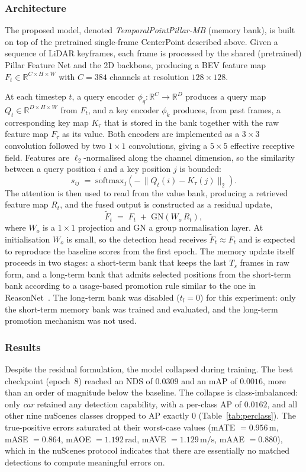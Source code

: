 \documentclass[12pt,a4paper]{report}
\begin{document}
\subsubsection{Architecture}
\quad The proposed model, denoted \emph{TemporalPointPillar-MB}
(memory bank), is built on top of the pretrained single-frame
CenterPoint described above. Given a sequence of LiDAR keyframes,
each frame is processed by the shared (pretrained) Pillar Feature
Net and the 2D backbone, producing a BEV feature map
$F_t \in \mathbb{R}^{C \times H \times W}$ with $C = 384$ channels
at resolution $128 \times 128$.

\quad At each timestep $t$, a query encoder
$\phi_q : \mathbb{R}^{C} \to \mathbb{R}^{D}$ produces a query map
$Q_t \in \mathbb{R}^{D \times H \times W}$ from $F_t$, and a key
encoder $\phi_k$ produces, from past frames, a corresponding key
map $K_\tau$ that is stored in the bank together with the raw
feature map $F_\tau$ as its value. Both encoders are implemented
as a $3 \times 3$ convolution followed by two $1 \times 1$
convolutions, giving a $5 \times 5$ effective receptive field.
Features are $\ell_2$-normalised along the channel dimension, so
the similarity between a query position $i$ and a key position $j$
is bounded:
\[
s_{ij} \;=\; \mathrm{softmax}_j\!\left(
  -\,\lVert Q_t(i) - K_\tau(j) \rVert_2
\right).
\]
The attention is then used to read from the value bank, producing
a retrieved feature map $R_t$, and the fused output is constructed
as a residual update,
\[
\tilde{F}_t \;=\; F_t \;+\; \mathrm{GN}(W_{\!o}\, R_t),
\]
where $W_{\!o}$ is a $1 \times 1$ projection and $\mathrm{GN}$ a
group normalisation layer. At initialisation $W_{\!o}$ is small,
so the detection head receives $\tilde{F}_t \approx F_t$ and is
expected to reproduce the baseline scores from the first epoch.
The memory update itself proceeds in two stages: a short-term bank
that keeps the last $T_s$ frames in raw form, and a long-term bank
that admits selected positions from the short-term bank according
to a usage-based promotion rule similar to the one in
ReasonNet~\cite{Shao2023ReasonNet}.
The long-term bank was disabled ($t_l = 0$) for this experiment:
only the short-term memory bank was trained and evaluated, and the
long-term promotion mechanism was not used.

\subsubsection{Results}
\quad Despite the residual formulation, the model collapsed
during training. The best checkpoint (epoch~8) reached an NDS of
$0.0309$ and an mAP of $0.0016$, more than an order of magnitude
below the baseline. The collapse is class-imbalanced: only
\emph{car} retained any detection capability, with a per-class AP
of $0.0162$, and all other nine nuScenes classes dropped to AP
exactly $0$ (Table~\ref{tab:perclass}). The true-positive errors
saturated at their worst-case values (mATE $= 0.956\,\text{m}$,
mASE $= 0.864$, mAOE $= 1.192\,\text{rad}$, mAVE $= 1.129\,
\text{m/s}$, mAAE $= 0.880$), which in the nuScenes protocol
indicates that there are essentially no matched detections to
compute meaningful errors on.
\end{document}
